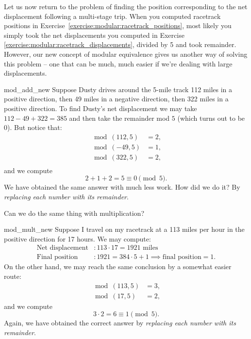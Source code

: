 Let us now return to the problem of finding the position corresponding to the net displacement following a multi-stage trip.
When you computed racetrack positions in Exercise~\ref{exercise:modular:racetrack_positions}, most 
likely you simply took the net displacements you computed in Exercise \ref{exercise:modular:racetrack_displacements}, divided by 5 and took remainder. 
However, our new concept of modular equivalence gives us another way of solving this problem -- one that can be much, much easier if we're dealing with large displacements.

\begin{example}{mod_add_new}
Suppose  Dusty drives around the 5-mile track 112 miles in a positive direction, then 49 miles in a negative direction, then 322 miles in a positive direction.  To find Dusty's net displacement we may take $112 - 49 + 322 = 385$ and then take the remainder mod $5$ (which turns out to be 0). But notice that:
\begin{align*}
\bmod(112,5) &= 2,\\
\bmod(-49,5) &= 1,\\
\bmod(322,5) &= 2,\\
\end{align*}
and we compute
\[2 + 1 + 2 = 5 \equiv 0 \pmod{5}. \]
We have obtained the same answer with much less work. How did we do it? By \emph{replacing each number with its remainder}.
\end{example}

\noindent
Can we do the same thing with multiplication? 

\begin{example}{mod_mult_new}
Suppose I travel on my racetrack at a 113 miles per hour in the positive direction  for 17 hours. We may compute:
\begin{align*}
\text{Net displacement}&: 113 \cdot 17 = 1921 \text{ miles}\\
\text{Final position}&: 1921 = 384\cdot 5 + 1 \implies \text{final position} = 1. 
\end{align*}
On the other hand, we may reach the same conclusion by a somewhat easier route:
\begin{align*}
\bmod(113,5) &= 3,\\
\bmod(17,5) &= 2,
\end{align*}
and we compute
\[3 \cdot 2 = 6 \equiv 1\pmod{5}. \]
Again, we have obtained the correct answer by \emph{replacing each number with its remainder}.
\end{example}

